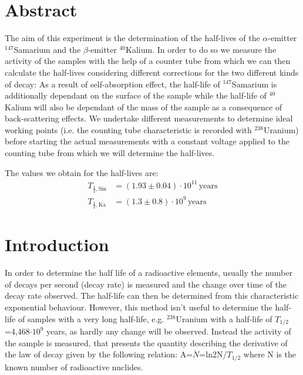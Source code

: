 \documentclass[12pt]{article}
\title{\vspace{0cm}{\Huge Fortgeschrittenen-Praktikum I:\\ \vspace{1cm} LHWZ}}
\author{Saskia Bondza\\Simon Stephan}
\date{Durchgeführt am 02.09.2016 und 05.09.2016}
\begin{document}
\maketitle
\newpage

\section*{Abstract}
The aim of this experiment is the determination of the half-lives of the $\alpha$-emitter ${}^{147}$Samarium and the $\beta$-emitter ${}^{40}$Kalium.
In order to do so we measure the activity of the samples with the help of a counter tube from which we can then calculate the half-lives considering different corrections for the two different kinds of decay: As a result of self-absorption effect, the half-life of ${}^{147}$Samarium is additionally dependant on the surface of the sample while the half-life of ${}^{40}$Kalium will also be dependant of the mass of the sample as a consequence of back-scattering effects.
We undertake different measurements to determine ideal working points (i.e. the counting tube characteristic is recorded with ${}^{238}$Uranium) before starting the actual measurements with a constant voltage applied to the counting tube from which we will determine the half-lives. 


The values we obtain for the half-lives are:
\begin{align*}
T_{\frac12,\text{Sm}}&=\left(1.93\pm0.04\right)\cdot10^{11}\,\text{years}\\
T_{\frac12,\text{Ka}}&=\left(1.3 \pm0.8 \right)\cdot10^{9} \,\text{years}
\end{align*}

\newpage

\thispagestyle{empty}
\tableofcontents
\newpage

\section{Introduction}
In order to determine the half life of a radioactive elements, usually the number of decays per second (decay rate) is measured and the change over time of the decay rate observed. The half-life can then be determined from this characteristic exponential behaviour. However, this method isn't useful to determine the half-life of samples with a very long half-life, e.g. ${}^{238}$Uranium with a half-life of $T_{1/2}$=4,468$\cdot 10^9$ years, as hardly any change will be observed. Instead the activity of the sample is measured, that presents the quantity describing the derivative of the law of decay given by the following relation: A=$\dot{N}$=ln2N/$T_{1/2}$ where N is the known number of radioactive nuclides.
\end{document}
